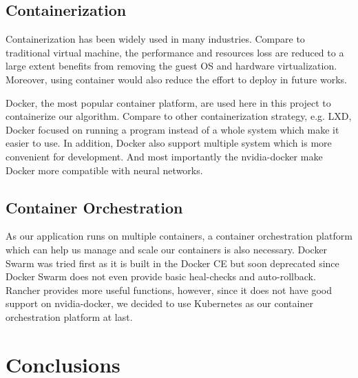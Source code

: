 \documentclass[runningheads]{llncs}
\begin{document}
\subsection{Containerization}
Containerization has been widely used in many industries. 
Compare to traditional virtual machine, the performance 
and resources loss are reduced to a large extent benefits 
from removing the guest OS and hardware virtualization. 
Moreover, using container would also reduce the effort to 
deploy in future works. 

Docker, the most popular container platform, are used here 
in this project to containerize our algorithm. Compare to 
other containerization strategy, e.g. LXD, Docker focused 
on running a program instead of a whole system which make 
it easier to use. In addition, Docker also support multiple 
system which is more convenient for development. And most 
importantly the nvidia-docker make Docker more compatible 
with neural networks.

\subsection{Container Orchestration}
As our application runs on multiple containers, a container 
orchestration platform which can help us manage and scale 
our containers is also necessary. Docker Swarm was tried 
first as it is built in the Docker CE but soon deprecated 
since Docker Swarm does not even provide basic heal-checks 
and auto-rollback. Rancher provides more useful functions, 
however, since it does not have good support on 
nvidia-docker, we decided to use Kubernetes as our 
container orchestration platform at last.


\section{Conclusions}


\clearpage



\end{document}
